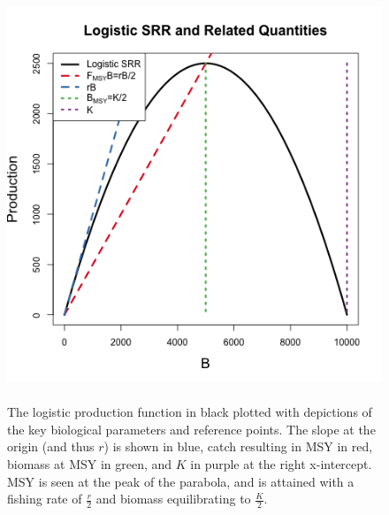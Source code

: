 \begin{figure}[h!]
\begin{minipage}[h!]{0.6\textwidth}
        \includegraphics[width=\textwidth]{./plots/srrSchaeffer.png}
\end{minipage}
\begin{minipage}[h!]{0.37\textwidth}
\caption{\label{srrSchaefer}
	\\The logistic production function in black plotted with depictions of the key biological parameters and reference points.
        The slope at the origin (and thus $r$) is shown in blue, catch resulting in MSY in red, biomass at MSY in green, and $K$ in purple at the right x-intercept.
        MSY is seen at the peak of the parabola, and is attained with a fishing rate of $\frac{r}{2}$ and biomass equilibrating to $\frac{K}{2}$.
}
\end{minipage}
\end{figure}

